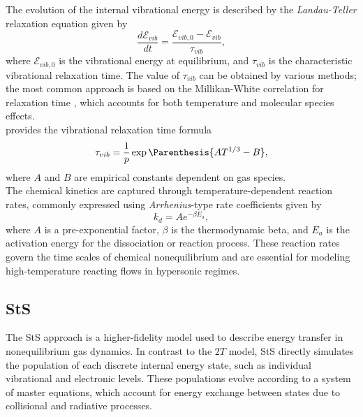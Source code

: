 The evolution of the internal vibrational energy is described by the
\textit{Landau-Teller} \cite{Hanquist2020} relaxation equation given by
\begin{equation}\label{eq:landauTeller}
\frac{d\mathcal{E}_{vib}}{dt} = \frac{\mathcal{E}_{vib, 0} -
    \mathcal{E}_{vib}}{\tau_{vib}},
\end{equation}
where $\mathcal{E}_{vib, 0}$ is the vibrational energy at equilibrium, and
$\tau_{vib}$ is the characteristic vibrational relaxation time. The value of
$\tau_{vib}$ can be obtained by various methods; the most common approach is
based on the Millikan-White correlation for relaxation time
\cite{Millikan1963}, which accounts for both temperature and molecular species
effects.\\

 provides the vibrational relaxation time formula
\begin{equation}\label{eq:millikanWhite}
    \tau_{vib} = \frac{1}{p} \exp\Parenthesis{ AT^{1/3} - B},
\end{equation}
where $A$ and $B$ are empirical constants dependent on gas species. \\

The chemical kinetics are captured through temperature-dependent reaction
rates, commonly expressed using \textit{Arrhenius}-type rate coefficients given
by
\begin{equation}\label{eq:arrheniusRates}
k_d = A e^{- \beta E_a },
\end{equation}
where $A$ is a pre-exponential factor, $\beta$ is the thermodynamic beta, and $E_a$ is the activation energy for the dissociation or reaction process. These reaction rates govern the time scales of chemical nonequilibrium and are essential for modeling high-temperature reacting flows in hypersonic regimes.

\subsection{\acrfull{StS}}
The \gls{StS} approach is a higher-fidelity model used to describe energy
transfer in nonequilibrium gas dynamics. In contrast to the $2T$ model,
\gls{StS} directly simulates the population of each discrete internal energy
state, such as individual vibrational and electronic levels. These populations
evolve according to a system of master equations, which account for energy
exchange between states due to collisional and radiative processes.\\

